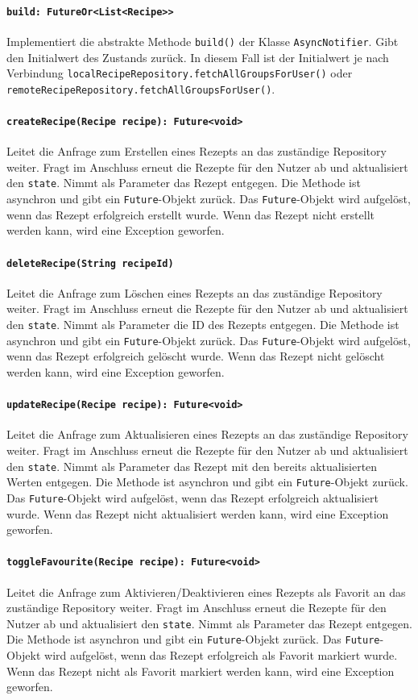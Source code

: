 \documentclass{entwurfsheft}
\begin{document}
\begin{sloppypar}
\paragraph{\texttt{build: FutureOr<List<Recipe>>}}
Implementiert die abstrakte Methode \texttt{build()} der Klasse \texttt{AsyncNotifier}.
Gibt den Initialwert des Zustands zurück. In diesem Fall ist der Initialwert je nach Verbindung \texttt{localRecipeRepository.fetchAllGroupsForUser()} oder \texttt{remoteRecipeRe\-pository.fetchAllGroupsForUser()}.
\paragraph{\texttt{createRecipe(Recipe recipe): Future<void>}}
Leitet die Anfrage zum Erstellen eines Rezepts an das zuständige Repository weiter. Fragt im Anschluss erneut die Rezepte für den Nutzer ab und aktualisiert den \texttt{state}. Nimmt als Parameter das Rezept entgegen. Die Methode ist asynchron und gibt ein \texttt{Future}-Objekt zurück. Das \texttt{Future}-Objekt wird aufgelöst, wenn das Rezept erfolgreich erstellt wurde. Wenn das Rezept nicht erstellt werden kann, wird eine Exception geworfen.
\paragraph{\texttt{deleteRecipe(String recipeId)}}
Leitet die Anfrage zum Löschen eines Rezepts an das zuständige Repository weiter. Fragt im Anschluss erneut die Rezepte für den Nutzer ab und aktualisiert den \texttt{state}. Nimmt als Parameter die ID des Rezepts entgegen. Die Methode ist asynchron und gibt ein \texttt{Future}-Objekt zurück. Das \texttt{Future}-Objekt wird aufgelöst, wenn das Rezept erfolgreich gelöscht wurde. Wenn das Rezept nicht gelöscht werden kann, wird eine Exception geworfen.
\paragraph{\texttt{updateRecipe(Recipe recipe): Future<void>}}
Leitet die Anfrage zum Aktualisieren eines Rezepts an das zuständige Repository weiter. Fragt im Anschluss erneut die Rezepte für den Nutzer ab und aktualisiert den \texttt{state}. Nimmt als Parameter das Rezept mit den bereits aktualisierten Werten entgegen. Die Methode ist asynchron und gibt ein \texttt{Future}-Objekt zurück. Das \texttt{Future}-Objekt wird aufgelöst, wenn das Rezept erfolgreich aktualisiert wurde. Wenn das Rezept nicht aktualisiert werden kann, wird eine Exception geworfen.
\paragraph{\texttt{toggleFavourite(Recipe recipe): Future<void>}}
Leitet die Anfrage zum Aktivieren/De\-aktivieren eines Rezepts als Favorit an das zuständige Repository weiter. Fragt im Anschluss erneut die Rezepte für den Nutzer ab und aktualisiert den \texttt{state}. Nimmt als Parameter das Rezept entgegen. Die Methode ist asynchron und gibt ein \texttt{Future}-Objekt zurück. Das \texttt{Future}-Objekt wird aufgelöst, wenn das Rezept erfolgreich als Favorit markiert wurde. Wenn das Rezept nicht als Favorit markiert werden kann, wird eine Exception geworfen.

\end{sloppypar}
\end{document}
